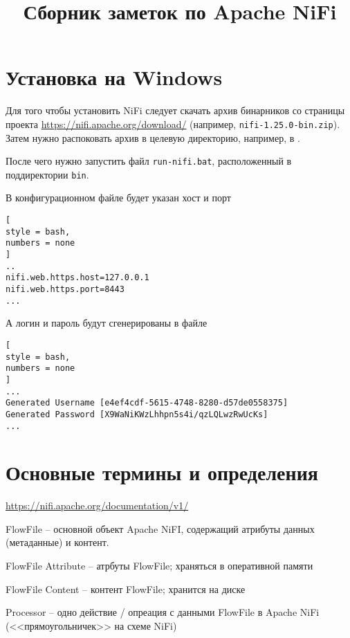 \documentclass[%
	11pt,
	a4paper,
	utf8,
		]{article}
\begin{document}
\title{Сборник заметок по Apache NiFi}

\author{}

\date{}
\maketitle

\thispagestyle{fancy}

\tableofcontents

\section{Установка на Windows}

Для того чтобы установить NiFi следует скачать архив бинарников со страницы проекта \url{https://nifi.apache.org/download/} (например, \verb*|nifi-1.25.0-bin.zip|). Затем нужно распоковать архив в целевую директорию, например, в . 

После чего нужно запустить файл \verb*|run-nifi.bat|, расположенный в поддиректории \verb*|bin|.

В конфигурационном файле  будет указан хост и порт
\begin{lstlisting}[
style = bash,
numbers = none
]
..
nifi.web.https.host=127.0.0.1
nifi.web.https.port=8443
...
\end{lstlisting}

А логин и пароль будут сгенерированы в файле 
\begin{lstlisting}[
style = bash,
numbers = none
]
...
Generated Username [e4ef4cdf-5615-4748-8280-d57de0558375]
Generated Password [X9WaNiKWzLhhpn5s4i/qzLQLwzRwUcKs]
...
\end{lstlisting}

\section{Основные термины и определения}

\url{https://nifi.apache.org/documentation/v1/}

FlowFile -- основной объект Apache NiFI, содержащий атрибуты данных (метаданные) и контент.

FlowFile Attribute -- атрбуты FlowFile; храняться в оперативной памяти

FlowFile Content -- контент FlowFile; хранится на диске

Processor -- одно действие / опреация с данными FlowFile в Apache NiFi (<<прямоугольничек>> на схеме NiFi)
\end{document}
